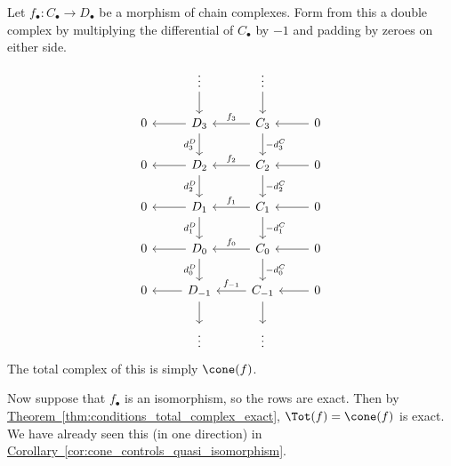 \documentclass[main.tex]{subfiles}
\begin{document}
\begin{example}
  Let $f_{\bullet}\colon C_{\bullet} \to D_{\bullet}$ be a morphism of chain complexes. Form from this a double complex by multiplying the differential of $C_{\bullet}$ by $-1$ and padding by zeroes on either side.
  \begin{equation*}
    \begin{tikzcd}
      & \vdots
      \arrow[d]
      & \vdots
      \arrow[d]
      \\
      0
      & D_{3}
      \arrow[d, swap, "d^{D}_{3}"]
      \arrow[l]
      & C_{3}
      \arrow[l, swap, "f_{3}"]
      \arrow[d, "-d^{C}_{3}"]
      & 0
      \arrow[l]
      \\
      0
      & D_{2}
      \arrow[l]
      \arrow[d, swap, "d^{D}_{2}"]
      & C_{2}
      \arrow[l, swap, "f_{2}"]
      \arrow[d, "-d^{C}_{2}"]
      & 0
      \arrow[l]
      \\
      0
      & D_{1}
      \arrow[d, swap, "d^{D}_{1}"]
      \arrow[l]
      & C_{1}
      \arrow[l, swap, "f_{1}"]
      \arrow[d, "-d^{C}_{1}"]
      & 0
      \arrow[l]
      \\
      0
      & D_{0}
      \arrow[d, swap, "d^{D}_{0}"]
      \arrow[l]
      & C_{0}
      \arrow[d, "-d^{C}_{0}"]
      \arrow[l, swap, "f_{0}"]
      & 0
      \arrow[l]
      \\
      0
      & D_{-1}
      \arrow[d]
      \arrow[l]
      & C_{-1}
      \arrow[l, swap, "f_{-1}"]
      \arrow[d]
      & 0
      \arrow[l]
      \\
      & \vdots
      & \vdots
    \end{tikzcd}
  \end{equation*}
  The total complex of this is simply $\cone(f)$.

  Now suppose that $f_{\bullet}$ is an isomorphism, so the rows are exact. Then by \hyperref[thm:conditions_total_complex_exact]{Theorem~\ref*{thm:conditions_total_complex_exact}}, $\Tot(f) = \cone(f)$ is exact. We have already seen this (in one direction) in \hyperref[cor:cone_controls_quasi_isomorphism]{Corollary~\ref*{cor:cone_controls_quasi_isomorphism}}.
\end{example}
\end{document}
